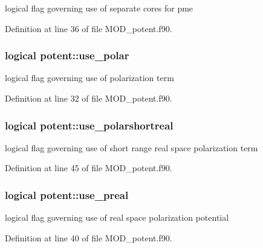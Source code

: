 logical flag governing use of separate cores for pme 



Definition at line 36 of file M\-O\-D\-\_\-potent.\-f90.

\hypertarget{classpotent_a0117aacb8fad6e63b030bda76b51784e}{
\subsubsection[{use\-\_\-polar}]{\setlength{\rightskip}{0pt plus 5cm}logical potent\-::use\-\_\-polar}}\label{classpotent_a0117aacb8fad6e63b030bda76b51784e}


logical flag governing use of polarization term 



Definition at line 32 of file M\-O\-D\-\_\-potent.\-f90.

\hypertarget{classpotent_a5ab904b7150799c7cd354d07fc5d4d43}{
\subsubsection[{use\-\_\-polarshortreal}]{\setlength{\rightskip}{0pt plus 5cm}logical potent\-::use\-\_\-polarshortreal}}\label{classpotent_a5ab904b7150799c7cd354d07fc5d4d43}


logical flag governing use of short range real space polarization term 



Definition at line 45 of file M\-O\-D\-\_\-potent.\-f90.

\hypertarget{classpotent_ad8fc08dbc413d1d6c9b637c1825d2571}{
\subsubsection[{use\-\_\-preal}]{\setlength{\rightskip}{0pt plus 5cm}logical potent\-::use\-\_\-preal}}\label{classpotent_ad8fc08dbc413d1d6c9b637c1825d2571}


logical flag governing use of real space polarization potential 



Definition at line 40 of file M\-O\-D\-\_\-potent.\-f90.

